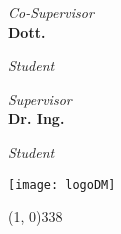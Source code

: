 \begin{titlepage}
\begin{center}
{\begin{large}
    \begin{flushleft}
    \textit{Co-Supervisor}\\ 
    \vspace{5pt} 
    \textbf{Dott. \myCoSupervisor}
    \end{flushleft}

    \vspace*{-4.23cm} 

    \begin{flushright}
    \textit{Student}\\ 
    \vspace{5pt} 
    \textbf{\myName}
    \end{flushright}
    \end{large}
}{
    \begin{large}
    \begin{flushleft}
    \textit{Supervisor}\\ 
    \vspace{5pt} 
    \textbf{Dr. Ing. \mySupervisor}
    \end{flushleft}

    \vspace*{-2.36cm} 

    \begin{flushright}
    \textit{Student}\\ 
    \vspace{5pt} 
    \textbf{\myName}
    \end{flushright}
    \end{large}
}

\vspace*{4cm}

\begin{center}
\texttt{[image: logoDM]}
\end{center}

\vfill
\line(1, 0){338} \\
\begin{normalsize}
\textsc{\myTime}
\end{normalsize}

\end{center}
\end{titlepage}
